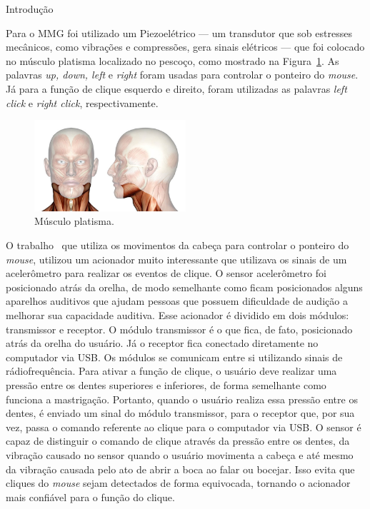 \begin{chapter}{Introdução}
\begin{figure}[H]
\end{figure}
Para o MMG foi utilizado um Piezoelétrico --- um transdutor que sob estresses
mecânicos, como vibrações e compressões, gera sinais elétricos --- que foi
colocado no músculo platisma localizado no pescoço, como mostrado na
Figura~\ref{fig:platisma}. As palavras \textit{up, down, left} e \textit{right}
foram usadas para controlar o ponteiro do \textit{mouse}. Já para a função de
clique esquerdo e direito, foram utilizadas as palavras \textit{left click} e
\textit{right click}, respectivamente.
\begin{figure}[H]
	\centering
	\includegraphics[width=0.5\textwidth]{fig/platisma}
	\caption{Músculo platisma.}
	\label{fig:platisma}
\end{figure}

O trabalho~\cite{Simpson08} que utiliza os movimentos da cabeça para controlar o
ponteiro do \textit{mouse}, utilizou um acionador muito interessante que
utilizava os sinais de um acelerômetro para realizar os eventos de clique. O
sensor acelerômetro foi posicionado atrás da orelha, de modo semelhante como
ficam posicionados alguns aparelhos auditivos que ajudam pessoas que possuem
dificuldade de audição a melhorar sua capacidade auditiva. Esse acionador é
dividido em dois módulos: transmissor e receptor. O módulo transmissor é o que
fica, de fato, posicionado atrás da orelha do usuário. Já o receptor fica
conectado diretamente no computador via USB. Os módulos se comunicam entre si
utilizando sinais de rádiofrequência. Para ativar a função de clique, o usuário
deve realizar uma pressão entre os dentes superiores e inferiores, de forma
semelhante como funciona a mastrigação. Portanto, quando o usuário realiza essa
pressão entre os dentes, é enviado um sinal do módulo transmissor, para o
receptor que, por sua vez, passa o comando referente ao clique para o computador
via USB. O sensor é capaz de distinguir o comando de clique através da pressão
entre os dentes, da vibração causado no sensor quando o usuário movimenta a
cabeça e até mesmo da vibração causada pelo ato de abrir a boca ao falar ou
bocejar. Isso evita que cliques do \textit{mouse} sejam detectados de forma
equivocada, tornando o acionador mais confiável para o função do clique. 


\end{chapter}
